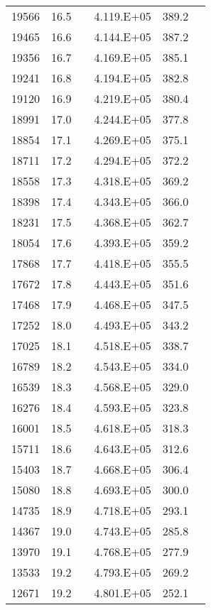 \begin{longtable}{cccccc}
  19566 & 16.5 &  & 4.119.E+05 & 389.2 &  \\
  19465 & 16.6 &  & 4.144.E+05 & 387.2 &  \\
  19356 & 16.7 &  & 4.169.E+05 & 385.1 &  \\
  19241 & 16.8 &  & 4.194.E+05 & 382.8 &  \\
  19120 & 16.9 &  & 4.219.E+05 & 380.4 &  \\
  18991 & 17.0 &  & 4.244.E+05 & 377.8 &  \\
  18854 & 17.1 &  & 4.269.E+05 & 375.1 &  \\
  18711 & 17.2 &  & 4.294.E+05 & 372.2 &  \\
  18558 & 17.3 &  & 4.318.E+05 & 369.2 &  \\
  18398 & 17.4 &  & 4.343.E+05 & 366.0 &  \\
  18231 & 17.5 &  & 4.368.E+05 & 362.7 &  \\
  18054 & 17.6 &  & 4.393.E+05 & 359.2 &  \\
  17868 & 17.7 &  & 4.418.E+05 & 355.5 &  \\
  17672 & 17.8 &  & 4.443.E+05 & 351.6 &  \\
  17468 & 17.9 &  & 4.468.E+05 & 347.5 &  \\
  17252 & 18.0 &  & 4.493.E+05 & 343.2 &  \\
  17025 & 18.1 &  & 4.518.E+05 & 338.7 &  \\
  16789 & 18.2 &  & 4.543.E+05 & 334.0 &  \\
  16539 & 18.3 &  & 4.568.E+05 & 329.0 &  \\
  16276 & 18.4 &  & 4.593.E+05 & 323.8 &  \\
  16001 & 18.5 &  & 4.618.E+05 & 318.3 &  \\
  15711 & 18.6 &  & 4.643.E+05 & 312.6 &  \\
  15403 & 18.7 &  & 4.668.E+05 & 306.4 &  \\
  15080 & 18.8 &  & 4.693.E+05 & 300.0 &  \\
  14735 & 18.9 &  & 4.718.E+05 & 293.1 &  \\
  14367 & 19.0 &  & 4.743.E+05 & 285.8 &  \\
  13970 & 19.1 &  & 4.768.E+05 & 277.9 &  \\
  13533 & 19.2 &  & 4.793.E+05 & 269.2 &  \\
  12671 & 19.2 &  & 4.801.E+05 & 252.1 &  \\
     \hline
\end{longtable}
